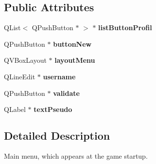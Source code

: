 \subsection*{Public Attributes}
\begin{DoxyCompactItemize}
\item 
\hypertarget{class_menu_start_a04d0eac4832176f91f62172757ce0616}{}Q\+List$<$ Q\+Push\+Button $\ast$ $>$ $\ast$ {\bfseries list\+Button\+Profil}\label{class_menu_start_a04d0eac4832176f91f62172757ce0616}

\item 
\hypertarget{class_menu_start_af01ac293a06b0da924be0ad29aa587cf}{}Q\+Push\+Button $\ast$ {\bfseries button\+New}\label{class_menu_start_af01ac293a06b0da924be0ad29aa587cf}

\item 
\hypertarget{class_menu_start_a9426199e93ab1722b19b4e4e178b0164}{}Q\+V\+Box\+Layout $\ast$ {\bfseries layout\+Menu}\label{class_menu_start_a9426199e93ab1722b19b4e4e178b0164}

\item 
\hypertarget{class_menu_start_abf21ea1841ef22859a15b1c201b8bbf6}{}Q\+Line\+Edit $\ast$ {\bfseries username}\label{class_menu_start_abf21ea1841ef22859a15b1c201b8bbf6}

\item 
\hypertarget{class_menu_start_a06ebe4101b60777e4e1465e1073d533b}{}Q\+Push\+Button $\ast$ {\bfseries validate}\label{class_menu_start_a06ebe4101b60777e4e1465e1073d533b}

\item 
\hypertarget{class_menu_start_a427333babe7349783094bc9257462cb0}{}Q\+Label $\ast$ {\bfseries text\+Pseudo}\label{class_menu_start_a427333babe7349783094bc9257462cb0}

\end{DoxyCompactItemize}


\subsection{Detailed Description}
Main menu, which appears at the game startup. 

